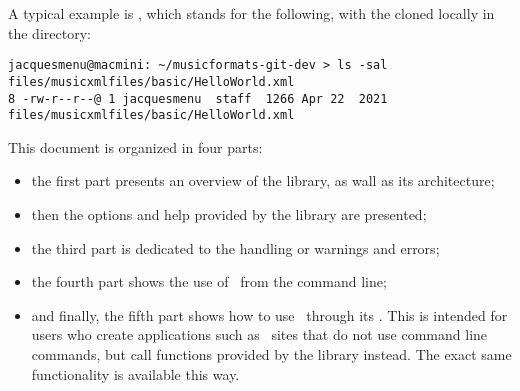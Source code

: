 A typical example is , which stands for the following, with the  cloned locally in the  directory:
\begin{lstlisting}[language=Terminal]
jacquesmenu@macmini: ~/musicformats-git-dev > ls -sal files/musicxmlfiles/basic/HelloWorld.xml
8 -rw-r--r--@ 1 jacquesmenu  staff  1266 Apr 22  2021 files/musicxmlfiles/basic/HelloWorld.xml
\end{lstlisting}

This document is organized in four parts:
\begin{itemize}
\item the first part presents an overview of the library, as wall as its architecture;
\item then the options and help provided by the library are presented;
\item the third part is dedicated to the handling or warnings and errors;
\item the fourth part shows the use of \mf\ from the command line;
\item and finally, the fifth part shows how to use \mf\ through its \API. This is intended for users who create applications such as \Web\ sites that do not use command line commands, but call functions provided by the library instead. The exact same functionality is available this way.
\end{itemize}

